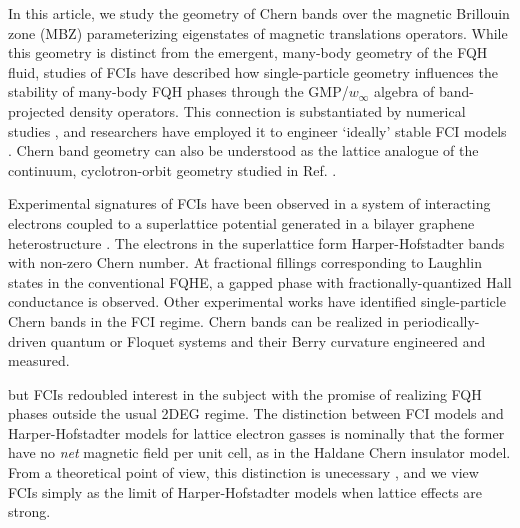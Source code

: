 \documentclass[aps,prb,twocolumn,letterpaper,twoside,nobalancelastpage,groupedaddress,amsmath,amssymb,floatfix,citeautoscript]{revtex4-1}
\begin{document}
 In this article, we study the geometry of Chern bands over the magnetic Brillouin zone (MBZ) parameterizing eigenstates of magnetic translations operators\cite{zak_magnetic_1964}. While this geometry is distinct from the emergent, many-body geometry of the FQH fluid, studies of FCIs have described how single-particle geometry influences the stability of many-body FQH phases through the GMP/$w_{\infty}$ algebra of band-projected density operators.\cite{Girvin:1986bu,parameswaran_fractional_2012,parameswaran_fractional_2013, roy_band_2014} This connection is substantiated by numerical studies \cite{jackson_geometric_2015,Claassen2015,bauer_quantum_2016}, and researchers have employed it to engineer `ideally' stable FCI models \cite{Lee2017}. Chern band geometry can also be understood as the lattice analogue of the continuum, cyclotron-orbit geometry studied in Ref. .

 Experimental signatures of FCIs have been observed in a system of interacting electrons coupled to a superlattice potential generated in a bilayer graphene heterostructure \cite{Spantoneaan8458}. The electrons in the superlattice form Harper-Hofstadter bands with non-zero Chern number. At fractional fillings corresponding to Laughlin states in the conventional FQHE, a gapped phase with fractionally-quantized Hall conductance is observed. \cite{Spantoneaan8458} Other experimental works have identified single-particle Chern bands in the FCI regime. \cite{Jotzu2014,Aidelsburger:2014hm,Aidelsburger:2013ew} Chern bands can be realized in periodically-driven quantum or Floquet systems and their Berry curvature engineered and measured.\cite{Flaschner1091}

\cite{kol_fractional_1993,palmer_high-field_2006}

but FCIs redoubled interest in the subject with the promise of realizing FQH phases outside the usual 2DEG regime. The distinction between FCI models and Harper-Hofstadter \cite{harper_general_1955,Azbel:1964tk,hofstadter_energy_1976} models for lattice electron gasses is nominally that the former have no \textit{net} magnetic field per unit cell, as in the Haldane Chern insulator model\cite{haldane_model_1988}. From a theoretical point of view, this distinction is unecessary \cite{mcgreevy_wave_2012}, and we view FCIs simply as the limit of Harper-Hofstadter models when lattice effects are strong. 
\end{document}

